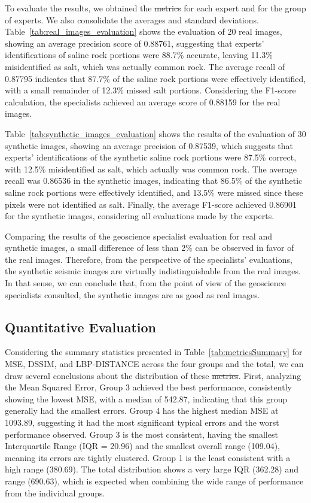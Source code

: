 \documentclass{ieeeaccess}
\makeatletter
\providecommand{\DIFaddtex}[1]{{\protect\color{blue}\uwave{#1}}} %
\providecommand{\DIFdeltex}[1]{{\protect\color{red}\sout{#1}}} %
\providecommand{\DIFaddbegin}{} %
\providecommand{\DIFaddend}{} %
\providecommand{\DIFdelbegin}{} %
\providecommand{\DIFdelend}{} %
\providecommand{\DIFadd}[1]{\texorpdfstring{\DIFaddtex{#1}}{#1}} %
\providecommand{\DIFdel}[1]{\texorpdfstring{\DIFdeltex{#1}}{}} %
\newcommand{\DIFscaledelfig}{0.5}
\newlength{\DIFdelgraphicswidth} %
\newlength{\DIFdelgraphicsheight} %
\newcommand{\DIFaddincludegraphics}[2][]{{\color{blue}\fbox{\DIFOincludegraphics[#1]{#2}}}} %
\newcommand{\DIFdelincludegraphics}[2][]{%
\sbox{\DIFdelgraphicsbox}{\DIFOincludegraphics[#1]{#2}}%
\settoboxwidth{\DIFdelgraphicswidth}{\DIFdelgraphicsbox} %
\settoboxtotalheight{\DIFdelgraphicsheight}{\DIFdelgraphicsbox} %
\scalebox{\DIFscaledelfig}{%
\parbox[b]{\DIFdelgraphicswidth}{\usebox{\DIFdelgraphicsbox}\\[-\baselineskip] \rule{\DIFdelgraphicswidth}{0em}}\llap{\resizebox{\DIFdelgraphicswidth}{\DIFdelgraphicsheight}{%
\setlength{\unitlength}{\DIFdelgraphicswidth}%
\begin{picture}(1,1)%
\thicklines\linethickness{2pt} %
{\color[rgb]{1,0,0}\put(0,0){\framebox(1,1){}}}%
{\color[rgb]{1,0,0}\put(0,0){\line( 1,1){1}}}%
{\color[rgb]{1,0,0}\put(0,1){\line(1,-1){1}}}%
\end{picture}%
}\hspace*{3pt}}} %
} %
\DeclareRobustCommand{\DIFaddbegin}{\DIFOaddbegin \let\includegraphics\DIFaddincludegraphics} %
\DeclareRobustCommand{\DIFaddend}{\DIFOaddend \let\includegraphics\DIFOincludegraphics} %
\DeclareRobustCommand{\DIFdelbegin}{\DIFOdelbegin \let\includegraphics\DIFdelincludegraphics} %
\DeclareRobustCommand{\DIFdelend}{\DIFOaddend \let\includegraphics\DIFOincludegraphics} %
\let\sout@orig\sout %
\renewcommand{\sout}[1]{\ifmmode\text{\sout@orig{\ensuremath{#1}}}\else\sout@orig{#1}\fi} %
\makeatother
\begin{document}
To evaluate the results, we obtained the \DIFdelbegin \DIFdel{metrics }\DIFdelend \DIFaddbegin \DIFadd{measures }\DIFaddend for each expert and for the group of experts. We also consolidate the averages and standard deviations. Table~\ref{tab:real_images_evaluation} shows the evaluation of 20 real images, showing an average precision score of 0.88761, suggesting that experts' identifications of saline rock portions were 88.7\% accurate, leaving 11.3\% misidentified as salt, which was actually common rock. The average recall of 0.87795 indicates that 87.7\% of the saline rock portions were effectively identified, with a small remainder of 12.3\% missed salt portions. Considering the F1-score calculation, the specialists achieved an average score of 0.88159 for the real images.

Table~\ref{tab:synthetic_images_evaluation} shows the results of the evaluation of 30 synthetic images, showing an average precision of 0.87539, which suggests that experts' identifications of the synthetic saline rock portions were 87.5\% correct, with 12.5\% misidentified as salt, which actually was common rock. The average recall was 0.86536 in the synthetic images, indicating that 86.5\% of the synthetic saline rock portions were effectively identified, and 13.5\% were missed since these pixels were not identified as salt. Finally, the average F1-score achieved 0.86901 for the synthetic images, considering all evaluations made by the experts.

Comparing the results of the geoscience specialist evaluation for real and synthetic images, a small difference of less than 2\% can be observed in favor of the real images. Therefore, from the perspective of the specialists' evaluations, the synthetic seismic images are virtually indistinguishable from the real images. In that sense, we can conclude that, from the point of view of the geoscience specialists consulted, the synthetic images are as good as real images.

\subsection{Quantitative Evaluation} 

Considering the summary statistics presented in Table~\ref{tab:metricsSummary} for MSE, DSSIM, and LBP-DISTANCE across the four groups and the total, we can draw several conclusions about the distribution of these \DIFdelbegin \DIFdel{metrics}\DIFdelend \DIFaddbegin \DIFadd{measures}\DIFaddend . First, analyzing the Mean Squared Error, Group 3 achieved the best performance, consistently showing the lowest MSE, with a median of 542.87, indicating that this group generally had the smallest errors. Group 4 has the highest median MSE at 1093.89, suggesting it had the most significant typical errors and the worst performance observed. Group 3 is the most consistent, having the smallest Interquartile Range (IQR = 20.96) and the smallest overall range (109.04), meaning its errors are tightly clustered. Group 1 is the least consistent with a high range (380.69). The total distribution shows a very large IQR (362.28) and range (690.63), which is expected when combining the wide range of performance from the individual groups.
\end{document}
